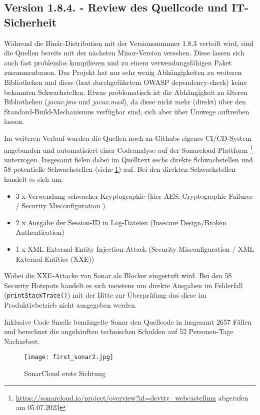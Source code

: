 \subsection{Version 1.8.4. - Review des Quellcode und IT-Sicherheit}
Während die Binär-Distribution mit der Versionsnummer 1.8.3 verteilt wird, sind die Quellen bereits mit der nächsten Minor-Version versehen. Diese lassen sich auch fast problemlos kompilieren und zu einem verwendungsfähigen Paket zusammenbauen. Das Projekt hat nur sehr wenig Abhängigkeiten zu weiteren Bibliotheken und diese (laut durchgeführtem OWASP dependency-check) keine bekannten Schwachstellen. Etwas problematisch ist die Abhängigkeit zu älteren Bibliotheken (\emph{javax.jms} und \emph{javax.mail}), da diese nicht mehr (direkt) über den Standard-Build-Mechanismus verfügbar sind, sich aber über Umwege auftreiben lassen.

Im weiteren Verlauf wurden die Quellen noch an Githubs eigenes CI/CD-System angebunden und automatisiert einer Codeanalyse auf der Sonarcloud-Plattform \footnote{\url{https://sonarcloud.io/project/overview?id=devtty_webcastellum} abgerufen am 05.07.2023} unterzogen. Insgesamt fielen dabei im Quelltext sechs direkte Schwachstellen und 58 potentielle Schwachstellen (siehe \ref{fig:my_sonar1}) auf. Bei den direkten Schwachstellen handelt es sich um:

\begin{itemize}
    \item 3 x Verwendung schwacher Kryptographie (hier AES; Cryptographic Failures / Security Misconfiguration )
    \item 2 x Ausgabe der Session-ID in Log-Dateien (Insecure Design/Broken Authentication)
    \item 1 x XML External Entity Injection Attack (Security Misconfiguration / XML External Entities (XXE))
\end{itemize}

Wobei die XXE-Attacke von Sonar als Blocker eingestuft wird. Bei den 58 Security Hotspots handelt es sich meistens um direkte Ausgaben im Fehlerfall (\verb=printStackTrace()=) mit der Bitte zur Überprüfung das diese im Produktivbetrieb nicht ausgegeben werden. 

Inklusive Code Smells bemängelte Sonar den Quellcode in insgesamt 2657 Fällen und berechnet die angehäuften technischen Schulden auf 52 Personen-Tage Nacharbeit. 

\begin{figure}
    \centering
    \texttt{[image: first\_sonar2.jpg]}
    \caption{SonarCloud erste Sichtung}
    \label{fig:my_sonar1}
\end{figure}

